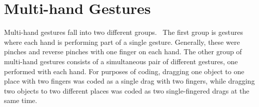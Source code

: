 %
%
%
%
%

\section{Multi-hand Gestures}

Multi-hand gestures fall into two different groups. \
The first group is gestures where each hand is performing part of a single gesture.
Generally, these were pinches and reverse pinches with one finger on each hand. 
The other group of multi-hand gestures consists of a simultaneous pair of different gestures, one performed with each hand. 
For purposes of coding, dragging one object to one place with two fingers was coded as a single drag with two fingers, while dragging two objects to two different places was coded as two single-fingered drags at the same time. 

